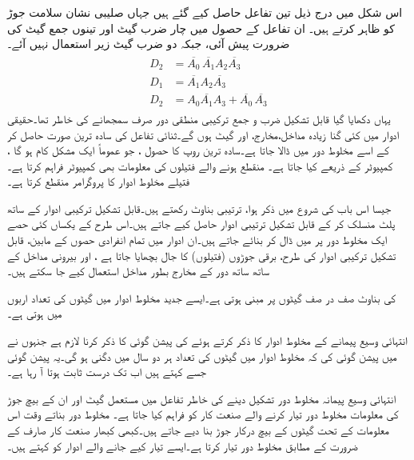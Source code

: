 اس شکل میں درج ذیل  تین تفاعل حاصل کیے گئے ہیں جہاں صلیبی  نشان سلامت جوڑ کو   ظاہر کرتے ہیں۔ ان تفاعل کے حصول میں چار ضرب گیٹ اور تینوں جمع گیٹ کی ضرورت پیش آئی، جبکہ دو ضرب گیٹ زیر استعمال نہیں آئے۔
\begin{gather}
\begin{aligned}
D_2&=\overline{A_0}\,\overline{A_1} A_2 \overline{A_3}\\
D_1&=\overline{A_1}A_2 \overline{A_3}\\
D_2&=A_0\overline{A_1}A_3+\overline{A_0}\,\overline{A_3}
\end{aligned}
\end{gather}
 یہاں دکھایا گیا قابل تشکیل ضرب و جمع ترکیبی منطقی دور صرف سمجھانے کی خاطر تھا۔حقیقی ادوار میں کئی گنا زیادہ مداخل،مخارج،  اور گیٹ ہوں گے۔ثنائی تفاعل کی سادہ ترین  صورت حاصل کر کے اسے مخلوط دور میں ڈالا جاتا ہے۔سادہ ترین  روپ کا حصول ، جو عموماً ایک مشکل کام ہو گا   ، کمپیوٹر کے ذریعے  کیا جاتا ہے۔ منقطع ہونے والے فتیلوں کی معلومات  بھی  کمپیوٹر فراہم کرتا ہے۔فتیلے مخلوط ادوار کا پروگرامر منقطع کرتا ہے۔


جیسا اس باب کی  شروع میں ذکر ہوا،   ترتیبی بناوٹ رکھتے ہیں۔قابل تشکیل ترکیبی ادوار کے ساتھ پلٹ منسلک کر کے قابل تشکیل ترتیبی ادوار حاصل کیے جاتے ہیں۔اس طرح کے  یکساں  کئی حصے ایک  مخلوط دور پر  میں ڈال  کر   بنائے جاتے ہیں۔ان ادوار میں تمام  انفرادی حصوں کے مابین،  قابل تشکیل ترکیبی ادوار کی طرح، برقی جوڑوں  (فتیلوں)  کا جال  بچھایا جاتا ہے ، اور بیرونی مداخل کے ساتھ ساتھ  دور کے  مخارج بطور مداخل استعمال کیے جا سکتے ہیں۔

 کی بناوٹ صف در صف گیٹوں پر مبنی ہوتی ہے۔ایسے جدید مخلوط ادوار میں گیٹوں کی تعداد اربوں میں  ہوتی ہے۔

انتہائی وسیع پیمانے کے مخلوط ادوار کا ذکر کرتے ہوئے  کی  پیشن گوئی کا ذکر کرنا لازم ہے جنہوں نے  میں پیشن گوئی کی کہ مخلوط ادوار میں گیٹوں کی تعداد ہر دو سال میں دگنی ہو گی۔یہ پیشن گوئی جسے  کہتے ہیں اب تک درست ثابت ہوتا آ رہا ہے۔

انتہائی وسیع پیمانہ  مخلوط  دور تشکیل دینے کی خاطر  تفاعل میں مستعمل  گیٹ اور ان کے بیچ جوڑ کی معلومات  مخلوط دور تیار کرنے والے صنعت کار کو فراہم  کیا جاتا ہے۔ مخلوط دور بناتے وقت اس معلومات کے تحت گیٹوں کے بیچ  درکار جوڑ بنا دیے جاتے ہیں۔کبھی کبھار صنعت کار صارف کے ضرورت کے مطابق مخلوط دور تیار کرتا ہے۔ایسے تیار کیے جانے والے ادوار کو کہتے ہیں۔


